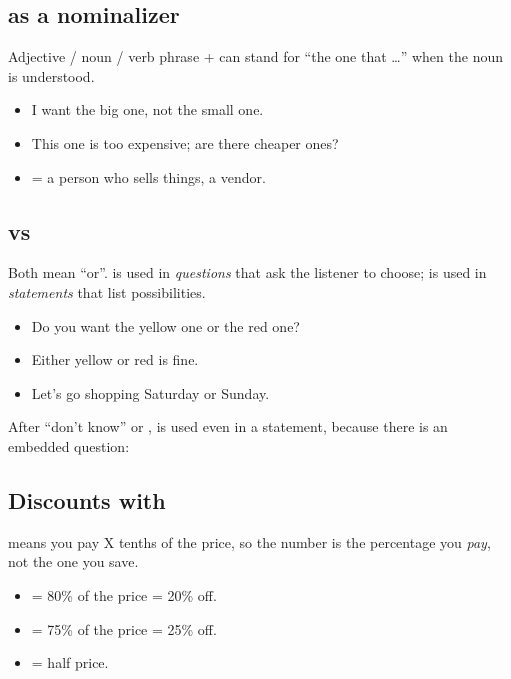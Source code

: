 \subsection{ as a nominalizer}

Adjective / noun / verb phrase +  can stand for ``the one that \ldots'' when the
noun is understood.
\begin{itemize}
  \item {} I want the big one, not the small one.
  \item {} This one is too expensive; are there cheaper ones?
  \item {} = a person who sells things, a vendor.
\end{itemize}

\subsection{ vs }

Both mean ``or''.  is used in \emph{questions} that ask the listener to choose;
 is used in \emph{statements} that list possibilities.

\begin{itemize}
  \item {} Do you want the yellow one or the red one?
  \item {} Either yellow or red is fine.
  \item {} Let's go shopping Saturday or Sunday.
\end{itemize}

\begin{important}[Exception]
After  ``don't know'' or ,  is used even in a statement,
because there is an embedded question: 
\end{important}

\subsection{Discounts with }

 means you pay X tenths of the price, so the number is the percentage you
\emph{pay}, not the one you save.
\begin{itemize}
  \item {} = 80\% of the price = 20\% off.
  \item {} = 75\% of the price = 25\% off.
  \item {} = half price.
\end{itemize}

